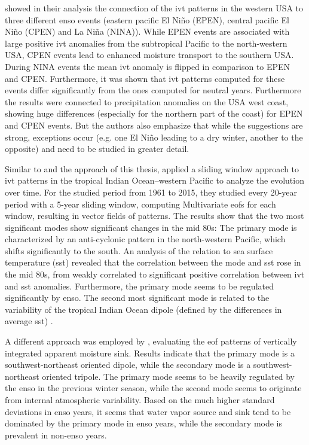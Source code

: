\citeauthor{kim_ensos_2015} showed in their analysis the connection of the \ac{ivt} patterns in the western USA to three different \ac{enso} events (eastern pacific El Niño (EPEN), central pacific El Niño (CPEN) and La Niña (NINA)). 
While EPEN events are associated with large positive \ac{ivt} anomalies from the subtropical Pacific to the north-western USA, CPEN events lead to enhanced moisture transport to the southern USA. 
During NINA events the mean \ac{ivt} anomaly is flipped in comparison to EPEN and CPEN. 
Furthermore, it was shown that \ac{ivt} patterns computed for these events differ significantly from the ones computed for neutral years.
Furthermore the results were connected to precipitation anomalies on the USA west coast, showing huge differences (especially for the northern part of the coast) for EPEN and CPEN events. 
But the authors also emphasize that while the suggestions are strong, exceptions occur (e.g. one El Niño leading to a dry winter, another to the opposite) and need to be studied in greater detail.

Similar to \cite{vietinghoff_visual_2021} and the approach of this thesis, \citeauthor{zou_interdecadal_2018} applied a sliding window approach to \ac{ivt} patterns in the tropical Indian Ocean–western Pacific to analyze the evolution over time. 
For the studied period from 1961 to 2015, they studied every 20-year period with a 5-year sliding window, computing Multivariate \acp{eof} for each window, resulting in vector fields of patterns. 
The results show that the two most significant modes show significant changes in the mid 80s: The primary mode is characterized by an anti-cyclonic pattern in the north-western Pacific, which shifts significantly to the south. 
An analysis of the relation to sea surface temperature (\ac{sst}) revealed that the correlation between the mode and \ac{sst} rose in the mid 80s, from weakly correlated to significant positive correlation between \ac{ivt} and \ac{sst} anomalies. 
Furthermore, the primary mode seems to be regulated significantly by \ac{enso}. 
The second most significant mode is related to the variability of the tropical Indian Ocean dipole (defined by the differences in average \ac{sst}) \cite{zou_interdecadal_2018}.

A different approach was employed by \cite{zou_investigating_2020}, evaluating the \ac{eof} patterns of vertically integrated apparent moisture sink. 
Results indicate that the primary mode is a southwest-northeast oriented dipole, while the secondary mode is a southwest-northeast oriented tripole. 
The primary mode seems to be heavily regulated by the \ac{enso} in the previous winter season, while the second mode seems to originate from internal atmospheric variability. 
Based on the much higher standard deviations in \ac{enso} years, it seems that water vapor source and sink tend to be dominated by the primary mode in \ac{enso} years, while the secondary mode is prevalent in non-\ac{enso} years. 


